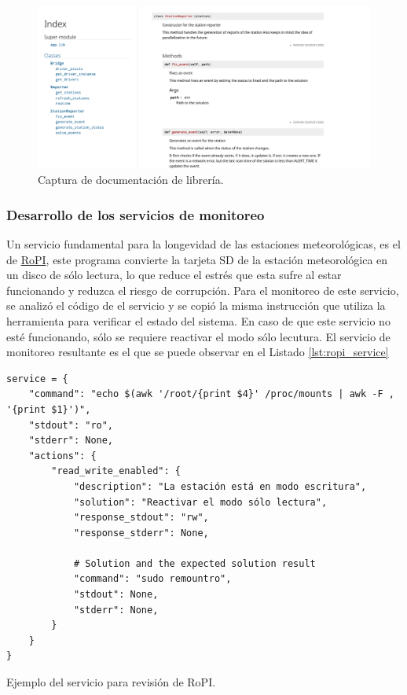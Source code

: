 \begin{figure}[!ht]
	\centering
	\includegraphics[width=1\linewidth]{images/screenshots/lib_docs_station.png}
	\caption{Captura de documentación de librería.}
	\label{fig:docs_station_reporter_lib}
\end{figure}

\subsubsection{Desarrollo de los servicios de monitoreo}

Un servicio fundamental para la longevidad de las estaciones meteorológicas, es el de \href{https://github.com/glennmckechnie/rorpi-raspberrypi}{RoPI}, este programa convierte la tarjeta SD de la estación meteorológica en un disco de sólo lectura, lo que reduce el estrés que esta sufre al estar funcionando y reduzca el riesgo de corrupción. Para el monitoreo de este servicio, se analizó el código de el servicio y se copió la misma instrucción que utiliza la herramienta para verificar el estado del sistema. En caso de que este servicio no esté funcionando, sólo se requiere reactivar el modo sólo lecutura. El servicio de monitoreo resultante es el que se puede observar en el Listado \ref{lst:ropi_service}

\begin{listing}
\begin{verbatim}
service = {
    "command": "echo $(awk '/root/{print $4}' /proc/mounts | awk -F , '{print $1}')",
    "stdout": "ro",
    "stderr": None,
    "actions": {
        "read_write_enabled": {
            "description": "La estación está en modo escritura",
            "solution": "Reactivar el modo sólo lectura",
            "response_stdout": "rw",
            "response_stderr": None,

            # Solution and the expected solution result
            "command": "sudo remountro",
            "stdout": None,
            "stderr": None,
        }
    }
}
\end{verbatim}
\caption{Ejemplo del servicio para revisión de RoPI.}
\label{lst:ropi_service}
\end{listing}

